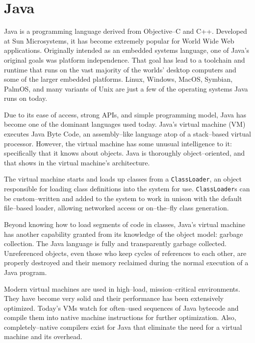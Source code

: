 \section{Java}
  Java\cite{java} is a programming language derived from Objective--C and C++.  Developed at Sun Microsystems, it has become extremely popular for World Wide Web applications.  Originally intended as an embedded systems language, one of Java's original goals was platform independence.  That goal has lead to a toolchain and runtime that runs on the vast majority of the worlds' desktop computers and some of the larger embedded platforms.  Linux, Windows, MacOS, Symbian, PalmOS, and many variants of Unix are just a few of the operating systems Java runs on today.  

  Due to its ease of access, strong APIs, and simple programming model, Java has become one of the dominant languages used today.  Java's virtual machine (VM) executes Java Byte Code, an assembly--like language atop of a stack--based virtual processor.  However, the virtual machine has some unusual intelligence to it: specifically that it knows about objects.  Java is thoroughly object--oriented, and that shows in the virtual machine's architecture.

  The virtual machine starts and loads up classes from a \texttt{ClassLoader}, an object responsible for loading class definitions into the system for use.  \texttt{ClassLoader}s can be custom--written and added to the system to work in unison with the default file--based loader, allowing networked access or on--the--fly class generation\cite{javassist}.

  Beyond knowing how to load segments of code in classes, Java's virtual machine has another capability granted from its knowledge of the object model: garbage collection.  The Java language is fully and transparently garbage collected.  Unreferenced objects, even those who keep cycles of references to each other, are properly destroyed and their memory reclaimed during the normal execution of a Java program.

  Modern virtual machines are used in high--load, mission--critical environments.  They have become very solid and their performance has been extensively optimized.  Today's VMs watch for often--used sequences of Java bytecode and compile them into native machine instructions for further optimization.  Also, completely--native compilers exist for Java\cite{GCJ} that eliminate the need for a virtual machine and its overhead.

